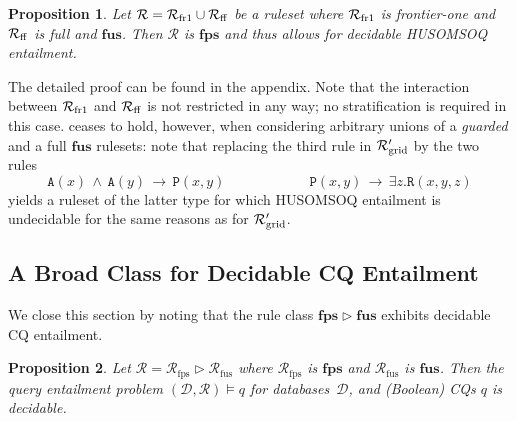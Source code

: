 \documentclass[10pt,a4paper]{amsart}
\theoremstyle{definition}
\numberwithin{equation}{section}
\theoremstyle{plain}
\newtheorem{proposition}[proposition]{Proposition}
\theoremstyle{definition}
\theoremstyle{myexample}
\theoremstyle{plain}
\theoremstyle{definition}
\newcommand{\database}{\mathcal{D}}
\newcommand{\db}{\database}
\newcommand{\cut}{\triangleright}
\newcommand{\ruleset}{\calr}
\newcommand{\fus}{\mathbf{fus}}
\newcommand{\fps}{\mathbf{fps}} %
\newcommand{\hcs}{\fps}
\newcommand{\fhcs}{\hcs}
\newcommand{\calr}{\mathcal{R}}
\newcommand{\pred}[1]{\mathtt{#1}}
\newcommand{\query}{q}
\begin{document}
\begin{proposition}\label{prop:frone-fusddl}
	Let $\ruleset = \ruleset_{\smash{\mathrm{fr1}}} \cup \ruleset_{\smash{\mathrm{ff}}}$ be a ruleset where $\ruleset_{\smash{\mathrm{fr1}}}$ is frontier-one and $\ruleset_{\smash{\mathrm{ff}}}$ is full and $\fus$. Then $\ruleset$ is $\fhcs$ and thus allows for decidable HUSOMSOQ entailment.  
\end{proposition}

%
The detailed proof can be found in the appendix. Note that the interaction between $\ruleset_{\smash{\mathrm{fr1}}}$ and $\ruleset_{\smash{\mathrm{ff}}}$ is not restricted in any way; no stratification is required in this case.
%
 ceases to hold, however, when considering arbitrary unions of a \emph{guarded} and a full $\fus$ rulesets: note that replacing the third rule in $\ruleset'_{\smash{\mathrm{grid}}}$ 
by the two rules 
$$ 
\pred{A}(x) {\,\wedge\,} \pred{A}(y) {\,\to\,} \pred{P}(x,\!y)
\qquad\qquad\qquad 
\pred{P}(x,\!y) {\,\to\,} \exists z. \pred{R}(x,\!y,\!z)
$$%
yields a ruleset of the latter type for which HUSOMSOQ entailment is undecidable for the same reasons as for $\ruleset'_{\smash{\mathrm{grid}}}$. 


\subsection{A Broad Class for Decidable CQ Entailment}
%
We close this section by noting that the rule class $\fhcs \cut \fus$ exhibits decidable CQ entailment.

\begin{proposition}\label{thm:fcs-fus-decidable}
	Let $\ruleset = \ruleset_\mathrm{fps} \cut \ruleset_\mathrm{fus}$ where $\ruleset_\mathrm{fps}$ is $\fhcs$ and $\ruleset_\mathrm{fus}$ is $\fus$. Then the query entailment problem $(\db,\ruleset) \models \query$ for databases~$\db$, and (Boolean) CQs $\query$ is decidable.
\end{proposition}
\end{document}
